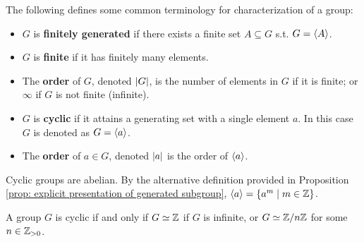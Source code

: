\documentclass{article}
\begin{document}
\begin{definition}
    The following defines some common terminology for characterization of a group:
    \begin{itemize}
        \item $G$ is \textbf{finitely generated} if there exists a finite set $A \subseteq G$ s.t. $G = \left\langle A \right\rangle$.
        \item $G$ is \textbf{finite} if it has finitely many elements. 
        \item The \textbf{order} of $G$, denoted $\left|G\right|$, is the number of elements in $G$ if it is finite; or $\infty$ if $G$ is not finite (infinite).
        \item $G$ is \textbf{cyclic} if it attains a generating set with a single element $a$. In this case $G$ is denoted as $G = \left\langle a \right\rangle$.
        \item The \textbf{order} of $a \in G$, denoted $\left|a\right|$ is the order of $\left\langle a \right\rangle$.  
    \end{itemize}
\end{definition}

\begin{remark}
    Cyclic groups are abelian. By the alternative definition provided in Proposition \ref{prop: explicit presentation of generated subgroup}, $\left\langle a \right\rangle = \{ a^m \mid m \in \mathbb{Z} \}$.
\end{remark}

\begin{proposition}\label{prop: characterization of cyclic group}
    A group $G$ is cyclic if and only if $G \simeq \mathbb{Z}$ if $G$ is infinite, or $G \simeq \mathbb{Z}/n\mathbb{Z}$ for some $n \in \mathbb{Z}_{>0}$.  
\end{proposition}
\end{document}
